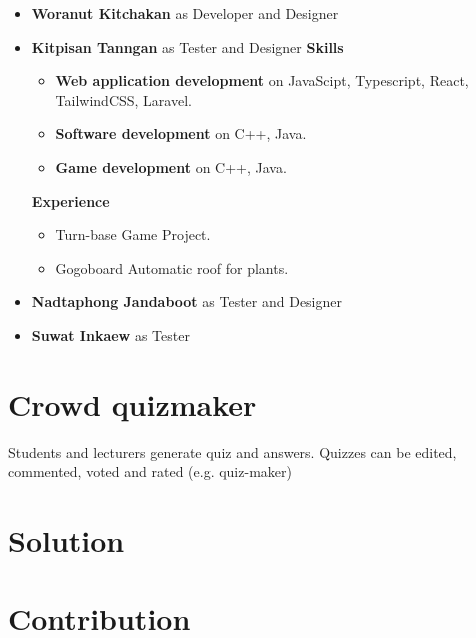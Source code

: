 \documentclass[a4paper, 12pt]{report}
\begin{document}
\begin{itemize}
            \item \textbf{Woranut Kitchakan} as Developer and Designer

            \item \textbf{Kitpisan Tanngan} as Tester and Designer
                \textbf{Skills}
                \begin{itemize}
                    \item \textbf{Web application development} on JavaScipt, Typescript, React, TailwindCSS, Laravel.
                    \item \textbf{Software development} on  C++, Java.
                    \item \textbf{Game development} on C++, Java.
                \end{itemize}
            
                \textbf{Experience}
                \begin{itemize}
                    \item Turn-base Game Project.
                    \item Gogoboard Automatic roof for plants.
                \end{itemize}

            \item \textbf{Nadtaphong Jandaboot} as Tester and Designer

            \item \textbf{Suwat Inkaew} as Tester

        \end{itemize}

    \pagebreak
    \section*{Crowd quizmaker}
    Students and lecturers generate quiz and answers. Quizzes can be edited, commented, voted and rated (e.g. quiz-maker)

    \section*{Solution}

    \blindtext

    \pagebreak
    \section*{Contribution}
\end{document}
